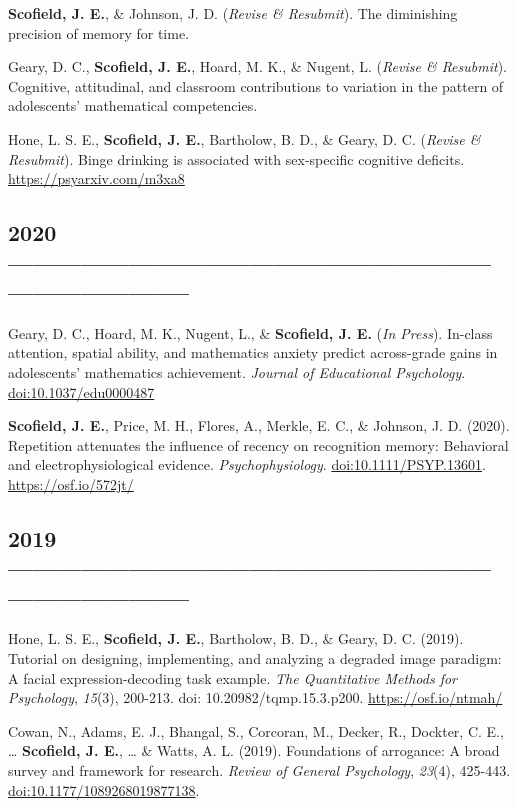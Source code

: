 \documentclass[11pt, a4paper]{awesome-cv}
\begin{document}
\textbf{Scofield, J. E.}, \& Johnson, J. D. (\emph{Revise \& Resubmit}). The diminishing precision of memory for time.

Geary, D. C., \textbf{Scofield, J. E.}, Hoard, M. K., \& Nugent, L. (\emph{Revise \& Resubmit}). Cognitive, attitudinal, and classroom contributions to variation in the pattern of adolescents' mathematical competencies.

Hone, L. S. E., \textbf{Scofield, J. E.}, Bartholow, B. D., \& Geary, D. C. (\emph{Revise \& Resubmit}). Binge drinking is associated with sex-specific cognitive deficits. \url{https://psyarxiv.com/m3xa8}

\hypertarget{section}{%
\subsection{2020 -----------------------------------------------------------------------------------}\label{section}}

Geary, D. C., Hoard, M. K., Nugent, L., \& \textbf{Scofield, J. E.} (\emph{In Press}). In-class attention, spatial ability, and mathematics anxiety predict across-grade gains in adolescents' mathematics achievement. \emph{Journal of Educational Psychology}. \url{doi:10.1037/edu0000487}

\textbf{Scofield, J. E.}, Price, M. H., Flores, A., Merkle, E. C., \& Johnson, J. D. (2020). Repetition attenuates the influence of recency on recognition memory: Behavioral and electrophysiological evidence. \emph{Psychophysiology}. \url{doi:10.1111/PSYP.13601}. \url{https://osf.io/572jt/}

\hypertarget{section-1}{%
\subsection{2019 -----------------------------------------------------------------------------------}\label{section-1}}

Hone, L. S. E., \textbf{Scofield, J. E.}, Bartholow, B. D., \& Geary, D. C. (2019). Tutorial on designing, implementing, and analyzing a degraded image paradigm: A facial expression-decoding task example. \emph{The Quantitative Methods for Psychology}, \emph{15}(3), 200-213. doi: 10.20982/tqmp.15.3.p200. \url{https://osf.io/ntmah/}

Cowan, N., Adams, E. J., Bhangal, S., Corcoran, M., Decker, R., Dockter, C. E., \ldots{} \textbf{Scofield, J. E.}, \ldots{} \& Watts, A. L. (2019). Foundations of arrogance: A broad survey and framework for research. \emph{Review of General Psychology}, \emph{23}(4), 425-443. \url{doi:10.1177/1089268019877138}.
\end{document}
